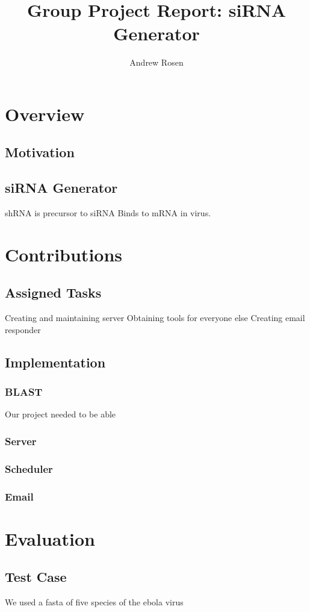 \documentclass[10pt,letterpaper]{article}
\author{Andrew Rosen}
\title{Group Project Report: siRNA Generator}
\date{}
\begin{document}
\maketitle

\section{Overview}


\subsection{Motivation}

\subsection{siRNA  Generator}
shRNA is precursor to siRNA
Binds to mRNA in virus.

\section{Contributions}




\subsection{Assigned Tasks}




Creating and maintaining server
Obtaining tools for everyone else
Creating email responder

\subsection{Implementation}

\subsubsection{BLAST}

Our project needed to be able 


\subsubsection{Server}

\subsubsection{Scheduler}

\subsubsection{Email}




\section{Evaluation}

\subsection{Test Case}
We used a fasta of five species of the ebola virus



\end{document}
